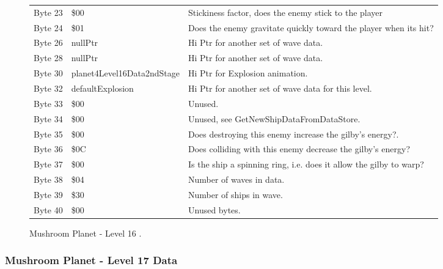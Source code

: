 \begin{figure}[H]
{\begin{adjustbox}{width=12cm}
\begin{tabular}{lll}
 Byte 23 & \$00                        & Stickiness factor, does the enemy stick to the player              \\
 Byte 24 & \$01                        & Does the enemy gravitate quickly toward the player when its hit?   \\
 Byte 26 & nullPtr                    & Hi Ptr for another set of wave data.                               \\
 Byte 28 & nullPtr                    & Hi Ptr for another set of wave data.                               \\
 Byte 30 & planet4Level16Data2ndStage & Hi Ptr for Explosion animation.                                    \\
 Byte 32 & defaultExplosion           & Hi Ptr for another set of wave data for this level.                \\
 Byte 33 & \$00                        & Unused.                                                            \\
 Byte 34 & \$00                        & Unused, see GetNewShipDataFromDataStore.                           \\
 Byte 35 & \$00                        & Does destroying this enemy increase the gilby's energy?.           \\
 Byte 36 & \$0C                        & Does colliding with this enemy decrease the gilby's energy?        \\
 Byte 37 & \$00                        & Is the ship a spinning ring, i.e. does it allow the gilby to warp? \\
 Byte 38 & \$04                        & Number of waves in data.                                           \\
 Byte 39 & \$30                        & Number of ships in wave.                                           \\
 Byte 40 & \$00                        & Unused bytes.                                                      \\
\bottomrule
\end{tabular}

  \end{adjustbox}

  }\caption*{Mushroom Planet - Level 16
.}
\end{figure}

\clearpage
\subsubsection{Mushroom Planet - Level 17 Data}

